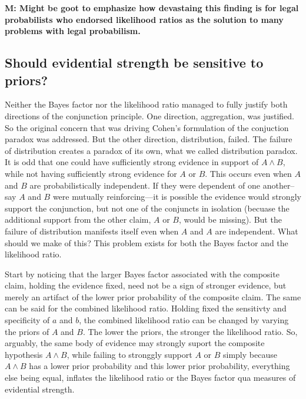 \documentclass[10pt,dvipsnames,enabledeprecatedfontcommands]{scrartcl}
\begin{document}

\textbf{M: Might be goot to emphasize how devastaing this finding is for legal probabilists 
who endorsed likelihood ratios as the solution to many problems with legal probabilism.}

\hypertarget{should-evidential-strength-be-sensitive-to-priors}{%
\subsection{Should evidential strength be sensitive to
priors?}\label{should-evidential-strength-be-sensitive-to-priors}}

Neither the Bayes factor nor the likelihood ratio managed to fully
justify both directions of the conjunction principle. One direction,
aggregation, was justified. So the original concern that was driving
Cohen's formulation of the conjuction paradox was addressed. But the
other direction, distribution, failed. The failure of distribution
creates a paradox of its own, what we called distribution paradox. It is
odd that one could have sufficiently strong evidence in support of
\(A\wedge B\), while not having sufficiently strong evidence for \(A\)
or \(B\). This occurs even when \(A\) and \(B\) are probabilistically
independent. If they were dependent of one another--say \(A\) and \(B\)
were mutually reinforcing---it is possible the evidence would strongly
support the conjunction, but not one of the conjuncts in isolation
(becuase the additional support from the other claim, \(A\) or \(B\),
would be missing). But the failure of distribution manifests itself even
when \(A\) and \(A\) are independent. What should we make of this? This
problem exists for both the Bayes factor and the likelihood ratio.

Start by noticing that the larger Bayes factor associated with the
composite claim, holding the evidence fixed, need not be a sign of
stronger evidence, but merely an artifact of the lower prior probability
of the composite claim. The same can be said for the combined likelihood
ratio. Holding fixed the sensitivty and specificity of \(a\) and \(b\),
the combined likelihood ratio can be changed by varying the priors of
\(A\) and \(B\). The lower the priors, the stronger the likelihood
ratio. So, arguably, the same body of evidence may strongly suport the
composite hypothesis \(A\wedge B\), while failing to stronggly support
\(A\) or \(B\) simply because \(A\wedge B\) has a lower prior
probability and this lower prior probability, everything else being
equal, inflates the likelihood ratio or the Bayes factor qua measures of
evidential strength.
\end{document}
